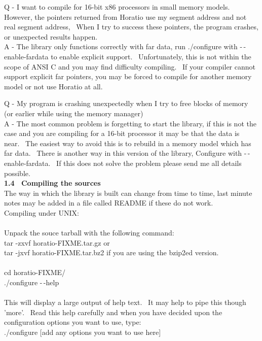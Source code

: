 \documentclass{article}
\begin{document}
\par Q - I want to compile for 16-bit x86 processors in small memory
models.~ However, the pointers returned from Horatio use my
segment address and not real segment address,~ When I try to
success these pointers, the program crashes, or unexpected results
happen.\\
A - The library only functions correctly with far data, run ./configure
with -$\,$-enable-fardata to enable explicit support.~ Unfortunately,
this is not within the scope of ANSI C and you may find difficulty
compiling.~ If your compiler cannot support explicit far pointers,
you may be forced to compile for another memory model or not use
Horatio at all.\\

\par Q - My program is crashing unexpectedly when I try to free blocks of
memory (or earlier while using the memory manager)
\\
A - The most common problem is forgetting to start the library, if
this is not the case and you are compiling for a 16-bit processor it
may
be that the data is near.~ The easiest way to avoid this is to
rebuild
in a memory model which has far data.~ There is another way in
this
version of the library, Configure with -$\,$-enable-fardata.~ If this
does not solve
the problem please send me all details possible.
\\
\textbf{1.4~ Compiling the sources}
\\
The way in which the library is
built can change from time to time,
last minute notes may be added in a file called README if these do not
work.\\
Compiling under UNIX:\\
\\
Unpack the souce tarball with the
following command:\\
tar -zxvf horatio-FIXME.tar.gz or\\
tar -jxvf horatio-FIXME.tar.bz2
if you are using the bzip2ed version.\\
\\
cd horatio-FIXME/\\
./configure -$\,$-help\\
\\
This will display a large output
of help text.~ It may help to
pipe this though 'more'.~ Read this help carefully and when you
have decided upon the configuration options you want to use, type:\\
./configure [add any options you
want to use here]\\
\end{document}
